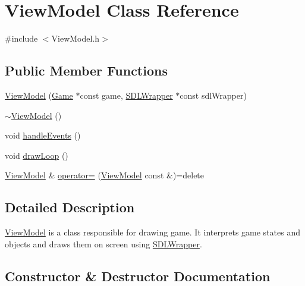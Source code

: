 \hypertarget{class_view_model}{}\section{View\+Model Class Reference}
\label{class_view_model}


{\ttfamily \#include $<$View\+Model.\+h$>$}

\subsection*{Public Member Functions}
\begin{DoxyCompactItemize}
\item 
\hyperlink{class_view_model_a4362afd8cb421ad3c68239cfa6e40147}{View\+Model} (\hyperlink{class_game}{Game} $\ast$const game, \hyperlink{class_s_d_l_wrapper}{S\+D\+L\+Wrapper} $\ast$const sdl\+Wrapper)
\item 
\hyperlink{class_view_model_a869892477a97aacfc6e730cc3116001d}{$\sim$\+View\+Model} ()
\item 
void \hyperlink{class_view_model_a61523157e57909d0d7af6f8bc0d00359}{handle\+Events} ()
\item 
void \hyperlink{class_view_model_aeabfa52897726d2912bda110f869e158}{draw\+Loop} ()
\item 
\hyperlink{class_view_model}{View\+Model} \& \hyperlink{class_view_model_a40a718d9f47ae920a027c38d13ec2995}{operator=} (\hyperlink{class_view_model}{View\+Model} const \&)=delete
\end{DoxyCompactItemize}


\subsection{Detailed Description}
\hyperlink{class_view_model}{View\+Model} is a class responsible for drawing game. It interprets game states and objects and draws them on screen using \hyperlink{class_s_d_l_wrapper}{S\+D\+L\+Wrapper}. 

\subsection{Constructor \& Destructor Documentation}
